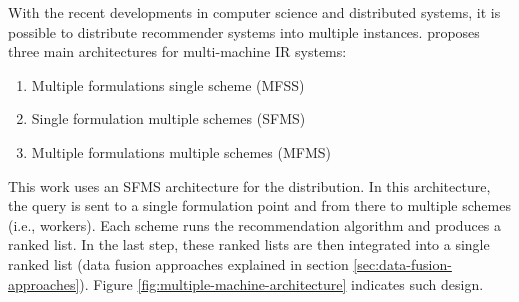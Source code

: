 With the recent developments in computer science and distributed systems, it is possible to distribute recommender systems into multiple instances. \cite{hsu2005comparing} proposes three main architectures for multi-machine IR systems:
\begin{enumerate}
    \item Multiple formulations single scheme (MFSS)
    \item Single formulation multiple schemes (SFMS)
    \item Multiple formulations multiple schemes (MFMS)
\end{enumerate}
This work uses an SFMS architecture for the distribution. In this architecture, the query is sent to a single formulation point and from there to multiple schemes (i.e., workers). Each scheme runs the recommendation algorithm and produces a ranked list. In the last step, these ranked lists are then integrated into a single ranked list (data fusion approaches explained in section \ref{sec:data-fusion-approaches}). Figure \ref{fig:multiple-machine-architecture} indicates such design.

